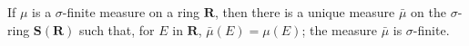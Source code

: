 If $\mu$ is a $\sigma$-finite measure on a ring $\mathbf{R}$, then there is a unique measure $\bar{\mu}$ on the $\sigma$-ring $\mathbf{S}(\mathbf{R})$ such that, for $E$ in $\mathbf{R}$, $\bar{\mu}(E) = \mu(E)$; the measure $\bar{\mu}$ is $\sigma$-finite.
